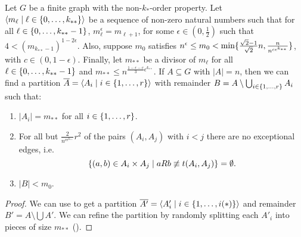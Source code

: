        \begin{lemma} \label{lem:existance_of_equitative_partition_with_bound_exceptional_pairs}
            Let $G$ be a finite graph with the non-$k_{*}$-order property.
            \sloppy Let $\left< m_\ell \mid \ell \in \{ 0, \dots, k_{**} \} \right>$ be a sequence of non-zero natural numbers such that
            for all $\ell \in \{ 0, \dots, k_{**}-1 \}$, $m_\ell^\epsilon = m_{\ell+1}$,
            for some $\epsilon \in (0, \frac{1}{2})$ such that $4 < (m_{k_{**}-1})^{1-2\epsilon}$.
            Also, suppose $m_0$ satisfies $n^\epsilon \leq m_0 < \min \{ \frac{\sqrt{2}-1}{\sqrt{2}} n, \frac{n}{n^{c \epsilon^{k_{**}}}} \}$,
            with $c \in (0, 1-\epsilon)$.
            Finally, let $m_{**}$ be a divisor of $m_\ell$ for all $\ell \in \{ 0, \dots, k_{**}-1 \}$ and
            $m_{**} \leq n^{\frac{1 - \epsilon - c}{3}\epsilon^{k_{**}}}$.
            If $A \subseteq G$ with $|A| = n$, then we can find a partition $\overline{A} = \left< A_i \mid i \in \{ 1, \dots, r \} \right>$
            with remainder $B = A \setminus \bigcup_{i \in \{ 1, \dots, r \}} A_i$ such that:
            \begin{enumerate}[label={\Roman*}., ref={\Roman*}, font=\rmfamily]
                \item \label{itm:existance_of_equitative_partition_with_bound_exceptional_pairs.1} $|A_i| = m_{**}$ for all $i \in \{ 1, \dots, r \}$.
                \item \label{itm:existance_of_equitative_partition_with_bound_exceptional_pairs.2} For all but $\frac{2}{n^{c\epsilon^{k_{**}}}}r^2$ of the pairs
                    $(A_i, A_j)$ with $i<j$ there are no exceptional edges, i.e.
                    \[
                        \{ (a,b) \in A_i \times A_j \mid a R b \not\equiv t(A_i, A_j) \} = \emptyset.
                    \]
                \item \label{itm:existance_of_equitative_partition_with_bound_exceptional_pairs.3} $|B| < m_0$.
            \end{enumerate}
            \begin{proof}
                We can use  to get a partition
                $\overline{A'} = \left< A'_i \mid i \in \{ 1, \dots, i(*) \} \right>$ and remainder $B' = A \setminus \bigcup A'$.
                We can refine the partition by randomly splitting each $A'_i$ into pieces of size $m_{**}$ ().

\end{proof}
\end{lemma}

